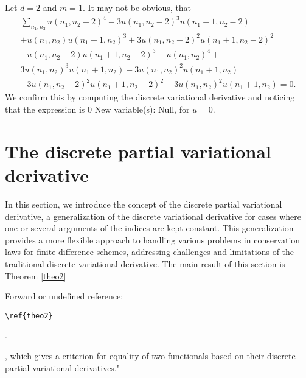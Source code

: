 \documentclass[runningheads]{llncs}
\newcommand{\1}{\chi}
\begin{document}
\begin{example}
	Let \(d=2\) and \(m=1\). It may not be obvious, that
	\begin{gather*}
		\sum_{n_1,n_2}u(n_1,n_2-2)^4 - 3 u(n_1,n_2-2)^3 u(n_1+1,n_2-2) \\+ 
		u(n_1,n_2) u(n_1+1,n_2)^3 + 3 u(n_1,n_2-2)^2 u(n_1+1,n_2-2)^2\\ -
		u(n_1,n_2-2) u(n_1+1,n_2-2)^3
		- u(n_1, n_2)^4 +\\
		3 u(n_1,n_2)^3 u(n_1+1,n_2)- 3 u(n_1,n_2)^2 u(n_1+1,n_2)\\
		-3 u(n_1,n_2-2)^2 u(n_1+1,n_2-2)^2+ 3 u(n_1,n_2)^2 u(n_1+1,n_2)=0.
	\end{gather*}
	We confirm this by computing the discrete variational derivative and noticing that the expression is \(0\)
{\color{blue} New variable(s): \(\text{Null}\),  }
 for \(u=0\).
\end{example}


\section{The discrete partial variational derivative}
\label{pvard}

In this section, we introduce the concept of the discrete partial variational derivative, a generalization of the discrete variational derivative for cases where one or several arguments of the indices are kept constant. This generalization provides a more flexible approach to handling various problems in conservation laws for finite-difference schemes, addressing challenges and limitations of the traditional discrete variational derivative. The main result of this section is Theorem \ref{theo2}
 {\color{red} Forward or undefined reference: \begin{verbatim}\ref{theo2}\end{verbatim}.}
, which gives a criterion for equality of two functionals based on their discrete partial variational derivatives."
\end{document}
